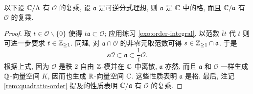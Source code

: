 \begin{proposition}\label{prop:CM-via-ideal}
	以下设 $\mathbb{C}/\Lambda$ 有 $\mathcal{O}$ 的复乘, 
	设 $\mathfrak{a}$ 是可逆分式理想, 则 $\mathfrak{a}$ 是 $\mathbb{C}$ 中的格, 而且 $\mathbb{C}/\mathfrak{a}$ 有 $\mathcal{O}$ 的复乘.
\end{proposition}
\begin{proof}
	取 $t \in \mathcal{O} \smallsetminus \{0\}$ 使得 $t\mathfrak{a} \subset \mathcal{O}$; 应用练习 \ref{exo:order-integral}, 以范数 $\overline{t}t$ 代 $t$ 则可进一步要求 $t \in \mathbb{Z}_{\geq 1}$. 同理, 对 $\mathfrak{a} \cap \mathcal{O}$ 的非零元取范数可得 $s \in \mathbb{Z}_{\geq 1} \cap \mathfrak{a}$. 于是
	\[ s\mathcal{O} \subset \mathfrak{a} \subset \frac{1}{t}\mathcal{O}. \]
	根据上式, 因为 $\mathcal{O}$ 是秩 $2$ 自由 $\mathbb{Z}$-模并在 $\mathbb{C}$ 中离散, $\mathfrak{a}$ 亦然, 而且 $\mathfrak{a}$ 和 $\mathcal{O}$ 一样生成 $\mathbb{Q}$-向量空间 $K$, 因而也生成 $\mathbb{R}$-向量空间 $\mathbb{C}$. 这些性质表明 $\mathfrak{a}$ 是格. 最后, 注记 \ref{rem:quadratic-order} 提及的性质表明 $\mathbb{C}/\mathfrak{a}$ 有 $\mathcal{O}$ 的复乘.
\end{proof}

